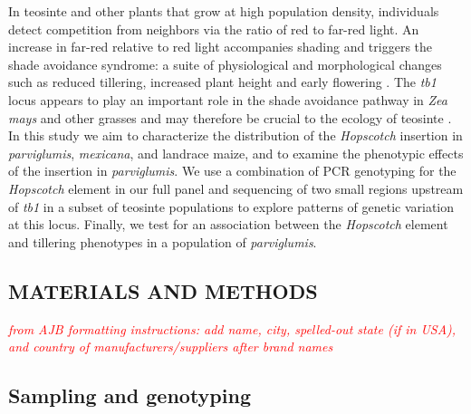 \documentclass[11pt]{article}
\newcommand{\mbh}[1]{\textcolor{red}{ \emph{\scriptsize  #1}} }
\begin{document}
\begin{linenumbers}
\begin{flushleft}
In teosinte and other plants that grow at high population density, individuals detect competition from neighbors via the ratio of red to far-red light.  An increase in far-red relative to red light accompanies shading and triggers the shade avoidance syndrome: a suite of physiological and morphological changes such as reduced tillering, increased plant height and early flowering \citep{KebromBrutnell2007}. The \emph{tb1} locus appears to play an important role in the shade avoidance pathway in \emph{Zea mays} and other grasses and may therefore be crucial to the ecology of teosinte \citep{KebromBrutnell2007, LukensDoebley1999}.  In this study we aim to characterize the distribution of the \emph{Hopscotch} insertion in \emph{parviglumis}, \emph{mexicana}, and landrace maize, and to examine the phenotypic effects of the insertion in \emph{parviglumis}. We use a combination of PCR genotyping for the \emph{Hopscotch} element in our full panel and sequencing of two small regions upstream of \emph{tb1} in a subset of teosinte populations to explore patterns of genetic variation at this locus. Finally, we test for an association between the \emph{Hopscotch} element and tillering phenotypes in a population of \emph{parviglumis}.

\begin{centering}
\section*{MATERIALS AND METHODS}
\end{centering}

\mbh{from AJB formatting instructions: add name, city, spelled-out state (if in USA), and country of manufacturers/suppliers after brand names}

\subsection*{Sampling and genotyping}


\end{flushleft}
\end{linenumbers}
\end{document}

